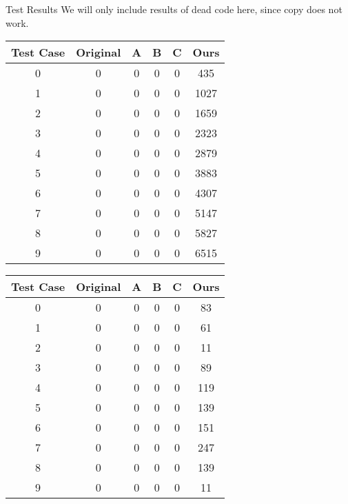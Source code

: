 \documentclass[letterpaper,12pt]{article}
\theoremstyle{definition}
\begin{document}
	\begin{section}{Test Results}
		We will only include results of dead code here, since copy does not work.
		\begin{center}
			\begin{tabular}{| c | c | c | c | c || c |}
				\hline
				Test Case & Original & A & B & C & Ours \\
				\hline
				0 & 0 & 0 & 0 & 0 & 435 \\
				\hline
				1 & 0 & 0 & 0 & 0 & 1027 \\
				\hline
				2 & 0 & 0 & 0 & 0 & 1659 \\
				\hline
				3 & 0 & 0 & 0 & 0 & 2323 \\
				\hline
				4 & 0 & 0 & 0 & 0 & 2879 \\
				\hline
				5 & 0 & 0 & 0 & 0 & 3883 \\
				\hline
				6 & 0 & 0 & 0 & 0 & 4307 \\
				\hline
				7 & 0 & 0 & 0 & 0 & 5147 \\
				\hline
				8 & 0 & 0 & 0 & 0 & 5827 \\
				\hline
				9 & 0 & 0 & 0 & 0 & 6515 \\
				\hline
			\end{tabular}
		\end{center}

		\begin{center}
			\begin{tabular}{| c | c | c | c | c || c |}
				\hline
				Test Case & Original & A & B & C & Ours \\
				\hline
				0 & 0 & 0 & 0 & 0 & 83 \\
				\hline
				1 & 0 & 0 & 0 & 0 & 61 \\
				\hline
				2 & 0 & 0 & 0 & 0 & 11 \\
				\hline
				3 & 0 & 0 & 0 & 0 & 89 \\
				\hline
				4 & 0 & 0 & 0 & 0 & 119 \\
				\hline
				5 & 0 & 0 & 0 & 0 & 139 \\
				\hline
				6 & 0 & 0 & 0 & 0 & 151 \\
				\hline
				7 & 0 & 0 & 0 & 0 & 247 \\
				\hline
				8 & 0 & 0 & 0 & 0 & 139 \\
				\hline
				9 & 0 & 0 & 0 & 0 & 11 \\
				\hline
			\end{tabular}
		\end{center}
	\end{section}
\end{document}
